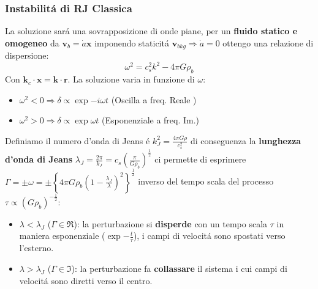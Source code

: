 \documentclass[12pt, a4paper]{article}
\begin{document}
\subsubsection{Instabilit\'{a} di RJ Classica}
La soluzione sar\'{a} una sovrapposizione di onde piane, per un \textbf{fluido statico e omogeneo} da $\textbf{v}_{b}=\dot{a}\textbf{x}$ imponendo staticit\'{a} $\textbf{v}_{bkg}\Rightarrow\dot{a}=0$ ottengo una relazione di dispersione:
\begin{equation}
\omega^2=c_s^2k^2-4\pi G\rho_b
\end{equation}
Con $\textbf{k}_c \cdot \textbf{x}=\textbf{k}\cdot \textbf{r}$. La soluzione varia in funzione di $\omega$:
\begin{itemize}
\item $\omega^2<0 \Rightarrow \delta \propto \exp{-i \omega t}$ (Oscilla a freq. Reale )
\item $\omega^2>0 \Rightarrow \delta \propto \exp{\omega t}$ (Esponenziale a freq. Im.)
\end{itemize}
Definiamo il numero d'onda di Jeans \'{e} $k_J^2=\frac{4\pi G\rho}{c_s^2}$ di conseguenza la \textbf{lunghezza d'onda di Jeans} $\lambda_J=\frac{2\pi}{k_J}=c_s(\frac{\pi}{G\rho_b})^{\frac{1}{2}}$ ci permette di esprimere $\Gamma=\pm \omega=\pm \left\{ 4\pi G\rho_b(1-\frac{\lambda_J}{\lambda})^2\right\}^{\frac{1}{2}}$ inverso del tempo scala del processo $\tau\propto (G \rho_b)^{-\frac{1}{2}}$:
\begin{itemize}
\item $\lambda<\lambda_J$ ($\Gamma \in \Re$): la perturbazione si \textbf{disperde} con un tempo scala $\tau$ in maniera esponenziale ($\exp{-\frac{t}{\tau}}$), i campi di velocit\'{a} sono spostati verso l'esterno.
\item $\lambda > \lambda_J$ ($\Gamma \in \Im$): la perturbazione fa \textbf{collassare} il sistema i cui campi di velocit\'{a} sono diretti verso il centro.
\end{itemize}
\end{document}
